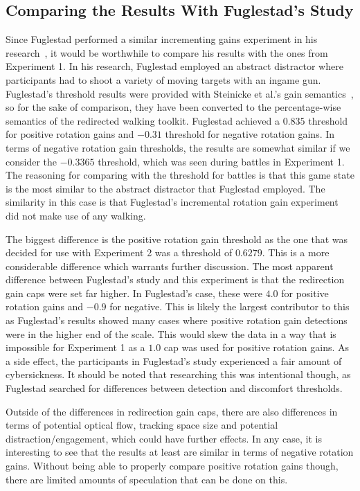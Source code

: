 \subsection{Comparing the Results With Fuglestad's Study}
Since Fuglestad performed a similar incrementing gains experiment in his research~\cite{fuglestad2018redirected}, it would be worthwhile to compare his results with the ones from Experiment 1. In his research, Fuglestad employed an abstract distractor where participants had to shoot a variety of moving targets with an ingame gun. Fuglestad's threshold results were provided with Steinicke et al.'s gain semantics~\cite{5072212}, so for the sake of comparison, they have been converted to the percentage-wise semantics of the redirected walking toolkit. Fuglestad achieved a $0.835$ threshold for positive rotation gains and $-0.31$ threshold for negative rotation gains. In terms of negative rotation gain thresholds, the results are somewhat similar if we consider the $-0.3365$ threshold, which was seen during battles in Experiment 1. The reasoning for comparing with the threshold for battles is that this game state is the most similar to the abstract distractor that Fuglestad employed. The similarity in this case is that Fuglestad's incremental rotation gain experiment did not make use of any walking. 

The biggest difference is the positive rotation gain threshold as the one that was decided for use with Experiment 2 was a threshold of $0.6279$. This is a more considerable difference which warrants further discussion. The most apparent difference between Fuglestad's study and this experiment is that the redirection gain caps were set far higher. In Fuglestad's case, these were $4.0$ for positive rotation gains and $-0.9$ for negative. This is likely the largest contributor to this as Fuglestad's results showed many cases where positive rotation gain detections were in the higher end of the scale. This would skew the data in a way that is impossible for Experiment 1 as a $1.0$ cap was used for positive rotation gains. As a side effect, the participants in Fuglestad's study experienced a fair amount of cybersickness. It should be noted that researching this was intentional though, as Fuglestad searched for differences between detection and discomfort thresholds.

Outside of the differences in redirection gain caps, there are also differences in terms of potential optical flow, tracking space size and potential distraction/engagement, which could have further effects. In any case, it is interesting to see that the results at least are similar in terms of negative rotation gains. Without being able to properly compare positive rotation gains though, there are limited amounts of speculation that can be done on this. 

